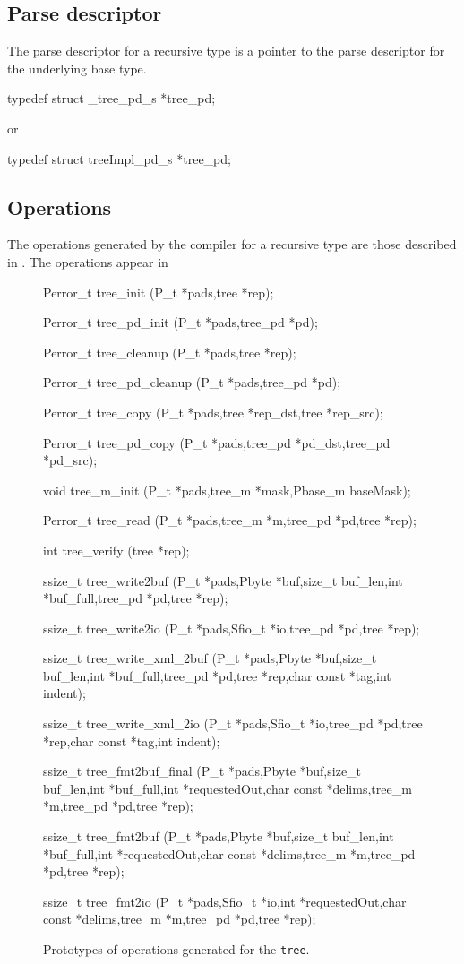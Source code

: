 \subsection{Parse descriptor}
\label{sec:recur-parse-descriptors}
The parse descriptor for a recursive type is a pointer to the parse
descriptor for the underlying base type.
\begin{code}
typedef struct _tree_pd_s *tree_pd;
\end{code}
or
\begin{code}
typedef struct treeImpl_pd_s *tree_pd;
\end{code}

\subsection{Operations}
The operations generated by the \pads{} compiler for a recursive type are
those described in .
The operations appear in 
\begin{figure}
\begin{code}
Perror_t tree_init (P_t *pads,tree *rep);

Perror_t tree_pd_init (P_t *pads,tree_pd *pd);

Perror_t tree_cleanup (P_t *pads,tree *rep);

Perror_t tree_pd_cleanup (P_t *pads,tree_pd *pd);

Perror_t tree_copy (P_t *pads,tree *rep_dst,tree *rep_src);

Perror_t tree_pd_copy (P_t *pads,tree_pd *pd_dst,tree_pd *pd_src);

void tree_m_init (P_t *pads,tree_m *mask,Pbase_m baseMask);

Perror_t tree_read (P_t *pads,tree_m *m,tree_pd *pd,tree *rep);

int tree_verify (tree *rep);

ssize_t tree_write2buf (P_t *pads,Pbyte *buf,size_t buf_len,int *buf_full,tree_pd *pd,tree *rep);

ssize_t tree_write2io (P_t *pads,Sfio_t *io,tree_pd *pd,tree *rep);

ssize_t tree_write_xml_2buf (P_t *pads,Pbyte *buf,size_t buf_len,int *buf_full,tree_pd *pd,tree *rep,char const *tag,int indent);

ssize_t tree_write_xml_2io (P_t *pads,Sfio_t *io,tree_pd *pd,tree *rep,char const *tag,int indent);

ssize_t tree_fmt2buf_final (P_t *pads,Pbyte *buf,size_t buf_len,int *buf_full,int *requestedOut,char const *delims,tree_m *m,tree_pd *pd,tree *rep);

ssize_t tree_fmt2buf (P_t *pads,Pbyte *buf,size_t buf_len,int *buf_full,int *requestedOut,char const *delims,tree_m *m,tree_pd *pd,tree *rep);

ssize_t tree_fmt2io (P_t *pads,Sfio_t *io,int *requestedOut,char const *delims,tree_m *m,tree_pd *pd,tree *rep);
\end{code}
\caption{Prototypes of operations generated for
  the \Precur{} \texttt{tree}.}
\label{figure:recur-ops}
\end{figure}



